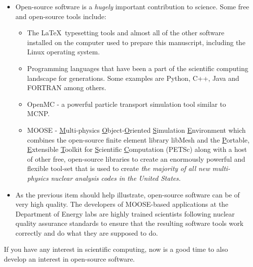 \begin{itemize}
\item Open-source software is a \emph{hugely} important contribution to science.  Some free and open-source tools include:
\begin{itemize}
\item The \LaTeX\ typesetting tools and almost all of the other software installed on the computer used to prepare this manuscript, including the Linux operating system.
\item Programming languages that have been a part of the scientific computing landscape for generations.  Some examples are Python, C++, Java and FORTRAN among others.
\item OpenMC\cite{ROMANO201590} - a powerful particle transport simulation tool similar to MCNP.
\item MOOSE - \underline{M}ulti-physics \underline{O}bject-\underline{O}riented \underline{S}imulation \underline{E}nvironment\cite{lindsay2022moose} which combines the open-source finite element library libMesh\cite{kirk2006libmesh} and the \underline{P}ortable, \underline{E}xtensible \underline{T}oolkit for \underline{S}cientific \underline{C}omputation (PETSc)\cite{petsc-user-ref} along with a host of other free, open-source libraries to create an enormously powerful and flexible tool-set that is used to create \emph{the majority of all new multi-physics nuclear analysis codes in the United States.}
\end{itemize} 
\item As the previous item should help illustrate, open-source software can be of very high quality.  The developers of MOOSE-based applications at the Department of Energy labs are highly trained scientists following nuclear quality assurance standards to ensure that the resulting software tools work correctly and do what they are supposed to do. 

 

\end{itemize}
If you have any interest in scientific computing, now is a good time to also develop an interest in open-source software.

